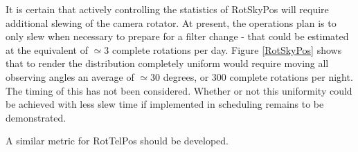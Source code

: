 It is certain that actively controlling the statistics of RotSkyPos
will require additional slewing of the camera rotator.  At present,
the operations plan is to only slew when necessary to prepare for a
filter change - that could be estimated at the equivalent of $\simeq
3$ complete rotations per day.  Figure \ref{RotSkyPos} shows that to
render the distribution completely uniform would require moving all
observing angles an average of $\simeq 30$ degrees, or 300 complete
rotations per night.  The timing of this has not been considered.
Whether or not this uniformity could be achieved with less slew time
if implemented in scheduling remains to be demonstrated.

A similar metric for RotTelPos should be developed.
